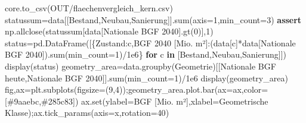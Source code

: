 \documentclass[
  ngerman,
  a4paper,
  DIV=11]{scrreprt}
\newenvironment{Shaded}{\begin{snugshade}}{\end{snugshade}}
\newcommand{\BuiltInTok}[1]{\textcolor[rgb]{0.00,0.23,0.31}{#1}}
\newcommand{\ControlFlowTok}[1]{\textcolor[rgb]{0.00,0.23,0.31}{\textbf{#1}}}
\newcommand{\DecValTok}[1]{\textcolor[rgb]{0.68,0.00,0.00}{#1}}
\newcommand{\FloatTok}[1]{\textcolor[rgb]{0.68,0.00,0.00}{#1}}
\newcommand{\KeywordTok}[1]{\textcolor[rgb]{0.00,0.23,0.31}{\textbf{#1}}}
\newcommand{\NormalTok}[1]{\textcolor[rgb]{0.00,0.23,0.31}{#1}}
\newcommand{\OperatorTok}[1]{\textcolor[rgb]{0.37,0.37,0.37}{#1}}
\newcommand{\StringTok}[1]{\textcolor[rgb]{0.13,0.47,0.30}{#1}}
\begin{document}
\begin{Shaded}
\begin{Highlighting}[]
\NormalTok{core.to\_csv(OUT}\OperatorTok{/}\StringTok{\textquotesingle{}flaechenvergleich\_kern.csv\textquotesingle{}}\NormalTok{)}
\NormalTok{statussum}\OperatorTok{=}\NormalTok{data[[}\StringTok{\textquotesingle{}Bestand\textquotesingle{}}\NormalTok{,}\StringTok{\textquotesingle{}Neubau\textquotesingle{}}\NormalTok{,}\StringTok{\textquotesingle{}Sanierung\textquotesingle{}}\NormalTok{]].}\BuiltInTok{sum}\NormalTok{(axis}\OperatorTok{=}\DecValTok{1}\NormalTok{,min\_count}\OperatorTok{=}\DecValTok{3}\NormalTok{)}
\ControlFlowTok{assert}\NormalTok{ np.allclose(statussum[data[}\StringTok{\textquotesingle{}Nationale BGF 2040\textquotesingle{}}\NormalTok{].gt(}\DecValTok{0}\NormalTok{)],}\DecValTok{1}\NormalTok{)}
\NormalTok{status}\OperatorTok{=}\NormalTok{pd.DataFrame([\{}\StringTok{\textquotesingle{}Zustand\textquotesingle{}}\NormalTok{:c,}\StringTok{\textquotesingle{}BGF 2040 [Mio. m²]\textquotesingle{}}\NormalTok{:(data[c]}\OperatorTok{*}\NormalTok{data[}\StringTok{\textquotesingle{}Nationale BGF 2040\textquotesingle{}}\NormalTok{]).}\BuiltInTok{sum}\NormalTok{(min\_count}\OperatorTok{=}\DecValTok{1}\NormalTok{)}\OperatorTok{/}\FloatTok{1e6}\NormalTok{\} }\ControlFlowTok{for}\NormalTok{ c }\KeywordTok{in}\NormalTok{ [}\StringTok{\textquotesingle{}Bestand\textquotesingle{}}\NormalTok{,}\StringTok{\textquotesingle{}Neubau\textquotesingle{}}\NormalTok{,}\StringTok{\textquotesingle{}Sanierung\textquotesingle{}}\NormalTok{]])}
\NormalTok{display(status)}
\NormalTok{geometry\_area}\OperatorTok{=}\NormalTok{data.groupby(}\StringTok{\textquotesingle{}Geometrie\textquotesingle{}}\NormalTok{)[[}\StringTok{\textquotesingle{}Nationale BGF heute\textquotesingle{}}\NormalTok{,}\StringTok{\textquotesingle{}Nationale BGF 2040\textquotesingle{}}\NormalTok{]].}\BuiltInTok{sum}\NormalTok{(min\_count}\OperatorTok{=}\DecValTok{1}\NormalTok{)}\OperatorTok{/}\FloatTok{1e6}
\NormalTok{display(geometry\_area)}
\NormalTok{fig,ax}\OperatorTok{=}\NormalTok{plt.subplots(figsize}\OperatorTok{=}\NormalTok{(}\DecValTok{9}\NormalTok{,}\DecValTok{4}\NormalTok{))}\OperatorTok{;}\NormalTok{geometry\_area.plot.bar(ax}\OperatorTok{=}\NormalTok{ax,color}\OperatorTok{=}\NormalTok{[}\StringTok{\textquotesingle{}\#9aaebc\textquotesingle{}}\NormalTok{,}\StringTok{\textquotesingle{}\#285c83\textquotesingle{}}\NormalTok{])}
\NormalTok{ax.}\BuiltInTok{set}\NormalTok{(ylabel}\OperatorTok{=}\StringTok{\textquotesingle{}BGF [Mio. m²]\textquotesingle{}}\NormalTok{,xlabel}\OperatorTok{=}\StringTok{\textquotesingle{}Geometrische Klasse\textquotesingle{}}\NormalTok{)}\OperatorTok{;}\NormalTok{ax.tick\_params(axis}\OperatorTok{=}\StringTok{\textquotesingle{}x\textquotesingle{}}\NormalTok{,rotation}\OperatorTok{=}\DecValTok{40}\NormalTok{)}

\end{Highlighting}
\end{Shaded}
\end{document}
